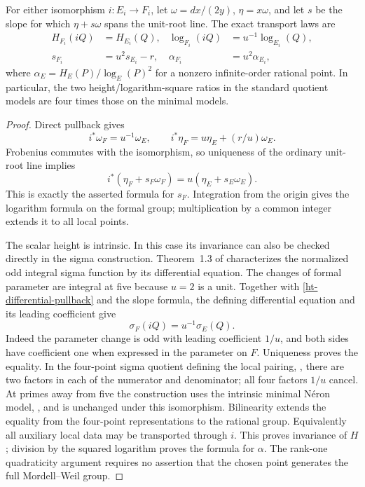 \begin{theorem}
\label{ht-transport}
For either isomorphism \(i:E_i\longrightarrow F_i\), let
\(\omega=dx/(2y)\), \(\eta=x\omega\), and let \(s\) be the slope
for which \(\eta+s\omega\) spans the unit-root line. The exact
transport laws are
\begin{align}
 H_{F_i}(iQ)&=H_{E_i}(Q),&
 \log_{F_i}(iQ)&=u^{-1}\log_{E_i}(Q),\\
 s_{F_i}&=u^2s_{E_i}-r,&
 \alpha_{F_i}&=u^2\alpha_{E_i},
 \label{ht-transport-laws}
\end{align}
where \(\alpha_E=H_E(P)/\log_E(P)^2\) for a nonzero infinite-order
rational point. In particular, the two height/logarithm-square ratios
in the standard quotient models are four times those on the minimal
models.
\end{theorem}
\begin{proof}
Direct pullback gives
\begin{equation}
 i^*\omega_F=u^{-1}\omega_E,\qquad
 i^*\eta_F=u\eta_E+(r/u)\omega_E.
 \label{ht-differential-pullback}
\end{equation}
Frobenius commutes with the isomorphism, so uniqueness of the ordinary
unit-root line implies
\[
 i^*(\eta_F+s_F\omega_F)=u(\eta_E+s_E\omega_E).
\]
This is exactly the asserted formula for \(s_F\). Integration from
the origin gives the logarithm formula on the formal group;
multiplication by a common integer extends it to all local points.

The scalar height is intrinsic. In this case its invariance can also
be checked directly in the sigma construction.
Theorem~1.3 of \cite{MazurSteinTateHeight} characterizes the normalized
odd integral sigma function by its differential equation. The changes
of formal parameter are integral at five because \(u=2\) is a unit.
Together with \eqref{ht-differential-pullback} and the slope formula,
the defining differential equation and its leading coefficient give
\begin{equation}
 \sigma_F(iQ)=u^{-1}\sigma_E(Q).
 \label{ht-sigma-transport}
\end{equation}
Indeed the parameter change is odd with leading coefficient \(1/u\),
and both sides have coefficient one when expressed in the parameter
on \(F\). Uniqueness proves the equality.
In the four-point sigma quotient defining the local pairing,
\cite[\S2.3]{MazurSteinTateHeight}, there are two factors in each of
the numerator and denominator; all four factors \(1/u\) cancel.
At primes away from five the construction uses the intrinsic minimal
N\'eron model, \cite[\S2.4]{MazurSteinTateHeight}, and is unchanged
under this isomorphism. Bilinearity extends the equality from the
four-point representations to the rational group. Equivalently all
auxiliary local data may be transported through \(i\).
This proves invariance of \(H\); division by the squared logarithm
proves the formula for \(\alpha\).
The rank-one quadraticity argument requires no assertion that the
chosen point generates the full Mordell--Weil group.
\end{proof}

